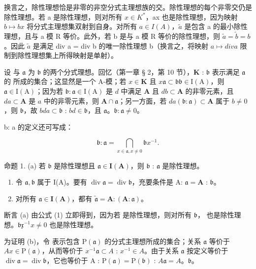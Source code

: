 换言之，除性理想恰是非零的非空分式主理想族的交。除性理想的每个非零交仍是除性理想。若 a 是除性理想，则对所有 \(x \in K^{*}\)，ax 也是除性理想，因为映射 \(b \mapsto bx\) 将分式主理想集双射到自身。对所有 \(a \in I(A)\)，\(\tilde{a}\) 是包含 a 的最小除性理想，且与 a 模 R 等价。此外，若 b 是与 a 模 R 等价的除性理想，则 \(\tilde{a} = \tilde{b} = b\)。因此 \(\tilde{a}\) 是满足 div a = div b 的唯一除性理想 b（换言之，将映射 \(a \mapsto div a\) 限制到除性理想集上所得映射是单射）。

设  与 \(\mathfrak{a}\) 为 \(\mathfrak{b}\) 的两个分式理想。回忆（第一章 § 2，第 10 节），\(\mathbf{K}\) : \(\mathfrak{b}\) 表示满足 \(\mathfrak{a}\) 的  所成的集合；这显然是一个 A-模；若 \(x \in \mathbf{K}\) 且 \(x\mathfrak{a} \subset \mathfrak{b}\)\(\mathfrak{b} \in \mathrm{I}(\mathrm{A})\)，则 \(\mathfrak{a} \in \mathrm{I}(\mathrm{A})\)；因为若 \(\mathfrak{b} \colon \mathfrak{a} \in \mathrm{I}(\mathrm{A})\) 是 \(d\) 中满足 \(\mathbf{A}\) 且 \(db \subset \mathbf{A}\) 的非零元素，且 \(da \subset \mathbf{A}\) 是 \(a\) 中的非零元素，则 \(\mathbf{A} \cap \mathfrak{a}\)；另一方面，若 \(da(\mathfrak{b} : \mathfrak{a}) \subset \mathbf{A}\) 属于 \(b \neq 0\)，则 \(\mathfrak{b}\)，故 \(bda \subset \mathfrak{b}\) : \(bd \in \mathfrak{b}\)，且 \(\mathfrak{a}\)。\(\mathfrak{b} : \mathfrak{a} \neq 0\)。

b: a 的定义还可写成：

\[
\mathfrak {b}: \mathfrak {a} = \bigcap_ {x \in \mathfrak {a}, x \neq 0} \mathfrak {b} x ^ {- 1}.\tag{1}
\]

命题 1. (a) 若 \(\mathfrak{b}\) 是除性理想且 \(\mathfrak{a} \in \mathbf{I}(\mathbf{A})\)，则 \(\mathfrak{b}\) : \(\mathfrak{a}\) 是除性理想。

\begin{enumerate}
\def\labelenumi{(\alph{enumi})}
\setcounter{enumi}{1}
\item
令 \(\mathfrak{a},\mathfrak{b}\) 属于 I(A)。要有 \(\operatorname {div}\mathfrak{a} = \operatorname {div}\mathfrak{b}\)，充要条件是 A: \(\mathfrak{a} = \mathbf{A}\) : \(\mathfrak{b}\)。
\item
对所有 \(\mathfrak{a} \in \mathbf{I}(\mathbf{A})\)，都有 \(\tilde{\mathfrak{a}} = \mathbf{A} : (\mathbf{A} : \mathfrak{a})\)。
\end{enumerate}

断言 (a) 由公式 (1) 立即得到，因为若  是除性理想，则对所有 \(\mathfrak{b}\)， 也是除性理想。\(\mathfrak{bx}^{-1}\)\(x \neq 0\) 也是除性理想。

为证明 (b)，令  表示包含 \(\mathrm{P}(\mathfrak{a})\) 的分式主理想所成的集合；关系 \(\mathfrak{a}\) 等价于 \(Ax \in \mathrm{P}(\mathfrak{a})\)，从而等价于 \(x^{-1}\mathfrak{a} \subset A\) : \(x^{-1} \in A\)。由于关系 \(\mathfrak{a}\) 按定义等价于 \(\operatorname{div} \mathfrak{a} = \operatorname{div} \mathfrak{b}\)，它也等价于 A : \(\mathrm{P}(\mathfrak{a}) = \mathrm{P}(\mathfrak{b})\) : \(A\)\(\mathfrak{a} = A\)。\(\mathfrak{b}\)。

